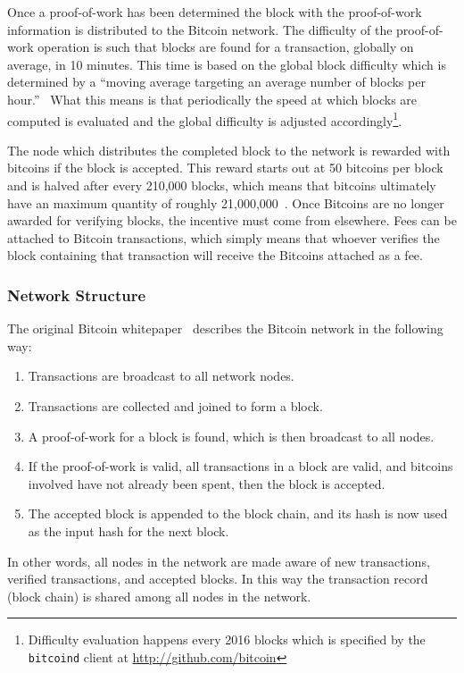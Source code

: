 \documentclass[11pt]{article}
\begin{document}
Once a proof-of-work has been determined the block with the proof-of-work information is distributed to the Bitcoin
network. The difficulty of the proof-of-work operation is such that blocks are found for a transaction, globally on
average, in 10 minutes. This time is based on the global block difficulty which is determined by a ``moving average
targeting an average number of blocks per hour.''~\cite{nakamoto08} What this means is that periodically the speed at
which blocks are computed is evaluated and the global difficulty is adjusted accordingly\footnote{Difficulty evaluation
happens every 2016 blocks which is specified by the {\tt bitcoind} client at \url{http://github.com/bitcoin}}.

The node which distributes the completed block to the network is rewarded with bitcoins if the block is accepted. This
reward starts out at 50 bitcoins per block and is halved after every 210,000 blocks, which means that bitcoins
ultimately have an maximum quantity of roughly 21,000,000~\cite{nakamoto08}. Once Bitcoins are no longer awarded for
verifying blocks, the incentive must come from elsewhere. Fees can be attached to Bitcoin transactions, which simply
means that whoever verifies the block containing that transaction will receive the Bitcoins attached as a fee.

\subsubsection{Network Structure}
The original Bitcoin whitepaper~\cite{nakamoto08} describes the Bitcoin network in the following way: 
    \begin{enumerate}
        \item Transactions are broadcast to all network nodes.
        \item Transactions are collected and joined to form a block.
        \item A proof-of-work for a block is found, which is then broadcast to all nodes.
        \item If the proof-of-work is valid, all transactions in a block are valid, and bitcoins involved have not
            already been spent, then the block is accepted. 
        \item The accepted block is appended to the block chain, and its hash is now used as the input hash for the next
            block.
    \end{enumerate}

In other words, all nodes in the network are made aware of new transactions, verified transactions, and accepted blocks.
In this way the transaction record (block chain) is shared among all nodes in the network.
\end{document}
